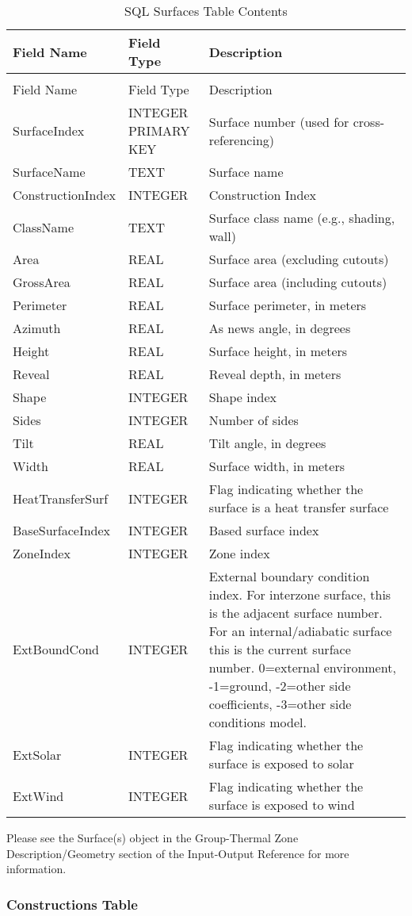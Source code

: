 \begin{longtable}[c]{>{\raggedright}p{1.5in}>{\raggedright}p{1.5in}>{\raggedright}p{3.0in}}
\caption{SQL Surfaces Table Contents \label{table:table-25.-sql-surfaces-table-contents}} \tabularnewline
\toprule 
Field Name & Field Type & Description \tabularnewline
\midrule
\endfirsthead

\caption[]{SQL Surfaces Table Contents} \tabularnewline
\toprule 
Field Name & Field Type & Description \tabularnewline
\midrule
\endhead

SurfaceIndex & INTEGER PRIMARY KEY & Surface number (used for cross-referencing) \tabularnewline
SurfaceName & TEXT & Surface name \tabularnewline
ConstructionIndex & INTEGER & Construction Index \tabularnewline
ClassName & TEXT & Surface class name (e.g., shading, wall) \tabularnewline
Area & REAL & Surface area (excluding cutouts) \tabularnewline
GrossArea & REAL & Surface area (including cutouts) \tabularnewline
Perimeter & REAL & Surface perimeter, in meters \tabularnewline
Azimuth & REAL & As news angle, in degrees \tabularnewline
Height & REAL & Surface height, in meters \tabularnewline
Reveal & REAL & Reveal depth, in meters \tabularnewline
Shape & INTEGER & Shape index \tabularnewline
Sides & INTEGER & Number of sides \tabularnewline
Tilt & REAL & Tilt angle, in degrees \tabularnewline
Width & REAL & Surface width, in meters \tabularnewline
HeatTransferSurf & INTEGER & Flag indicating whether the surface is a heat transfer surface \tabularnewline
BaseSurfaceIndex & INTEGER & Based surface index \tabularnewline
ZoneIndex & INTEGER & Zone index \tabularnewline
ExtBoundCond & INTEGER & External boundary condition index. For interzone surface, this is the adjacent surface number. For an internal/adiabatic surface this is the current surface number. 0=external environment, -1=ground, -2=other side coefficients, -3=other side conditions model. \tabularnewline
ExtSolar & INTEGER & Flag indicating whether the surface is exposed to solar \tabularnewline
ExtWind & INTEGER & Flag indicating whether the surface is exposed to wind \tabularnewline
\bottomrule
\end{longtable}

Please see the Surface(s) object in the Group-Thermal Zone Description/Geometry section of the Input-Output Reference for more information.

\subsubsection{Constructions Table}

